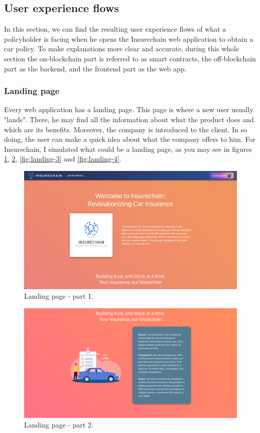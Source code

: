\subsection{User experience flows}
{
In this section, we can find the resulting user experience flows of what a policyholder is facing when he opens the Insurechain web application to obtain a car policy. To make explanations more clear and accurate, during this whole section the on-blockchain part is referred to as smart contracts, the off-blockchain part as the backend, and the frontend part as the web app.
}

\subsubsection{Landing page}
{
Every web application has a landing page. This page is where a new user usually "lands". There, he may find all the information about what the product does and which are its benefits. Moreover, the company is introduced to the client. In so doing, the user can make a quick idea about what the company offers to him. For Insurechain, I simulated what could be a landing page, as you may see in figures \ref{fig:landing-1}, \ref{fig:landing-2}, \ref{fig:landing-3} and \ref{fig:landing-4}.
\begin{figure}[H]
\centering
\includegraphics[width=14cm]{img/results/landing-1.png}
\caption[Landing page - part 1]{\footnotesize{Landing page - part 1.}}
\label{fig:landing-1}
\end{figure}

\begin{figure}[H]
\centering
\includegraphics[width=14cm]{img/results/landing-2.png}
\caption[Landing page - part 2]{\footnotesize{Landing page - part 2.}}
\label{fig:landing-2}
\end{figure}

}
